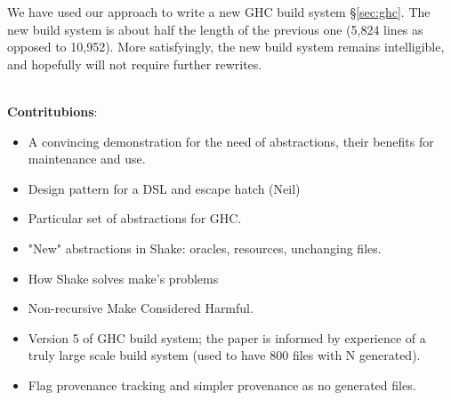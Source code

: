 We have used our approach to write a new GHC build system \S\ref{sec:ghc}. The
new build system is about half the length of the previous one (5,824 lines as
opposed to 10,952).  More satisfyingly,
the new build system remains intelligible, and hopefully will not require
further rewrites.


~\\
\textbf{Contritubions}:
\begin{itemize}
  \item A convincing demonstration for the need of abstractions,
  their benefits for maintenance and use.
  \item Design pattern for a DSL and escape hatch (Neil)
  \item Particular set of abstractions for GHC.
  \item "New" abstractions in Shake: oracles, resources, unchanging files.
  \item How Shake solves make's problems
  \item Non-recursive Make Considered Harmful.
  \item Version 5 of GHC build system; the paper is informed by
  experience of a truly large scale build system (used to 
  have 800 files with N generated).
  \item Flag provenance tracking and simpler provenance as no
  generated files. 
\end{itemize}
